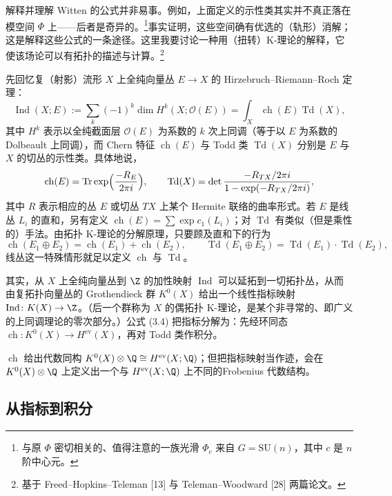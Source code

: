 解释并理解 Witten 的公式并非易事。例如，上面定义的示性类其实并不真正落在模空间 $\Phi$ 上——后者是奇异的。\footnote{与原 $\Phi$ 密切相关的、值得注意的一族光滑 $\Phi_c$ 来自 $G=\mathrm{SU}(n)$，其中 $c$ 是 $n$ 阶中心元。}事实证明，这些空间确有优选的（轨形）消解；这是解释这些公式的一条途径。这里我要讨论一种用（扭转）K-理论的解释，它使该场论可以有拓扑的描述与计算。\footnote{基于 Freed--Hopkins--Teleman [13] 与 Teleman--Woodward [28] 两篇论文。}

先回忆复（射影）流形 $X$ 上全纯向量丛 $E\to X$ 的 Hirzebruch--Riemann--Roch 定理：
\begin{equation}
\operatorname{Ind}(X;E):=\sum_k(-1)^k\dim H^k(X;\mathcal{O}(E))=\int_X\operatorname{ch}(E)\operatorname{Td}(X),
\tag{3.4}\label{eq:3.4}
\end{equation}
其中 $H^k$ 表示以全纯截面层 $\mathcal{O}(E)$ 为系数的 $k$ 次上同调（等于以 $E$ 为系数的 Dolbeault 上同调），而 Chern 特征 $\operatorname{ch}(E)$ 与 Todd 类 $\operatorname{Td}(X)$ 分别是 $E$ 与 $X$ 的切丛的示性类。具体地说，
\[
\operatorname{ch}(E)=\operatorname{Tr}\exp\Bigl(\frac{-R_E}{2\pi i}\Bigr),\qquad
\operatorname{Td}(X)=\det\frac{-R_{TX}/2\pi i}{1-\exp(-R_{TX}/2\pi i)},
\]
其中 $R$ 表示相应的丛 $E$ 或切丛 $TX$ 上某个 Hermite 联络的曲率形式。若 $E$ 是线丛 $L_i$ 的直和，另有定义 $\operatorname{ch}(E)=\sum\exp c_1(L_i)$；对 $\operatorname{Td}$ 有类似（但是乘性的）手法。由拓扑 K-理论的分解原理，只要顾及直和下的行为
\[
\operatorname{ch}(E_1\oplus E_2)=\operatorname{ch}(E_1)+\operatorname{ch}(E_2),\qquad
\operatorname{Td}(E_1\oplus E_2)=\operatorname{Td}(E_1)\cdot\operatorname{Td}(E_2),
\]
线丛这一特殊情形就足以定义 $\operatorname{ch}$ 与 $\operatorname{Td}$。

其实，从 $X$ 上全纯向量丛到 $\Z$ 的加性映射 $\operatorname{Ind}$ 可以延拓到一切拓扑丛，从而由复拓扑向量丛的 Grothendieck 群 $K^0(X)$ 给出一个线性指标映射 $\operatorname{Ind}\colon K(X)\to\Z$。（后一个群称为 $X$ 的偶拓扑 K-理论，是某个非寻常的、即广义的上同调理论的零次部分。）公式 (3.4) 把指标分解为：先经环同态 $\operatorname{ch}\colon K^0(X)\to H^{\mathrm{ev}}(X)$，再对 Todd 类作积分。

\begin{remark}
$\operatorname{ch}$ 给出代数同构 $K^0(X)\otimes\Q\cong H^{\mathrm{ev}}(X;\Q)$；但把指标映射当作迹，会在 $K^0(X)\otimes\Q$ 上定义出一个与 $H^{\mathrm{ev}}(X;\Q)$ 上不同的Frobenius 代数结构。
\end{remark}

\subsection{从指标到积分}


